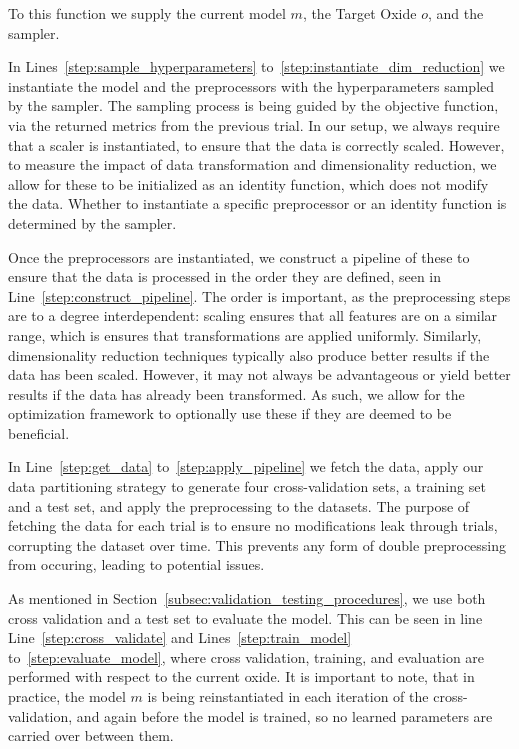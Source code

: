 To this function we supply the current model $m$, the Target Oxide $o$, and the sampler.

In Lines~\ref{step:sample_hyperparameters} to~\ref{step:instantiate_dim_reduction} we instantiate the model and the preprocessors with the hyperparameters sampled by the sampler.
The sampling process is being guided by the objective function, via the returned metrics from the previous trial.
In our setup, we always require that a scaler is instantiated, to ensure that the data is correctly scaled.
However, to measure the impact of data transformation and dimensionality reduction, we allow for these to be initialized as an identity function, which does not modify the data.
Whether to instantiate a specific preprocessor or an identity function is determined by the sampler.

Once the preprocessors are instantiated, we construct a pipeline of these to ensure that the data is processed in the order they are defined, seen in Line~\ref{step:construct_pipeline}.
The order is important, as the preprocessing steps are to a degree interdependent: scaling ensures that all features are on a similar range, which is ensures that transformations are applied uniformly.
Similarly, dimensionality reduction techniques typically also produce better results if the data has been scaled.
However, it may not always be advantageous or yield better results if the data has already been transformed.
As such, we allow for the optimization framework to optionally use these if they are deemed to be beneficial.

In Line~\ref{step:get_data} to~\ref{step:apply_pipeline} we fetch the data, apply our data partitioning strategy to generate four cross-validation sets, a training set and a test set, and apply the preprocessing to the datasets.
The purpose of fetching the data for each trial is to ensure no modifications leak through trials, corrupting the dataset over time.
This prevents any form of double preprocessing from occuring, leading to potential issues.

As mentioned in Section~\ref{subsec:validation_testing_procedures}, we use both cross validation and a test set to evaluate the model.
This can be seen in line Line~\ref{step:cross_validate} and Lines~\ref{step:train_model} to~\ref{step:evaluate_model}, where cross validation, training, and evaluation are performed with respect to the current oxide.
It is important to note, that in practice, the model $m$ is being reinstantiated in each iteration of the cross-validation, and again before the model is trained, so no learned parameters are carried over between them.

